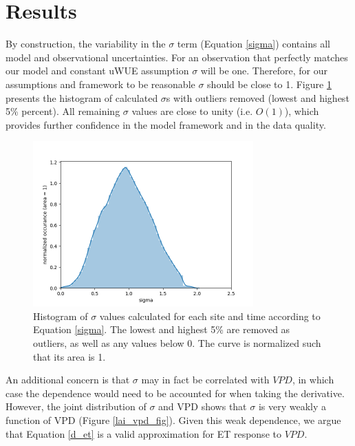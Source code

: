 \documentclass[draft,linenumbers]{agujournal}
\begin{document}
\section{Results}
\label{results}

By construction, the variability in the $\sigma$ term (Equation \ref{sigma}) contains all model and observational uncertainties. For an observation that perfectly matches our model and constant uWUE assumption $\sigma$ will be one. Therefore, for our assumptions and framework to be reasonable $\sigma$ should be close to 1. Figure \ref{lai_fig} presents the histogram of calculated $\sigma$s with outliers removed (lowest and highest 5\% percent). All remaining $\sigma$ values are close to unity (i.e. $O(1)$), which provides further confidence in the model framework and in the data quality.

\begin{figure}[h]
\centering
\includegraphics[width=20pc]{./fig02.png}
\caption{Histogram of $\sigma$ values calculated for each site and time according to Equation \ref{sigma}. The lowest and highest 5\% are removed as outliers, as well as any values below 0. The curve is normalized such that its area is 1. }
\label{lai_fig}
\end{figure}

An additional concern is that $\sigma$ may in fact be correlated with $VPD$, in which case the dependence would need to be accounted for when taking the derivative. However, the joint distribution of $\sigma$ and VPD shows that $\sigma$ is very weakly a function of VPD (Figure \ref{lai_vpd_fig}). Given this weak dependence, we argue that Equation \ref{d_et} is a valid approximation for ET response to $VPD$.
\end{document}
